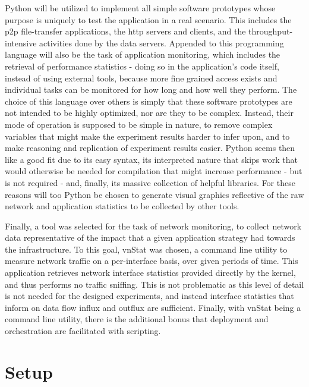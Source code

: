     Python \cite{python} will be utilized to implement all simple software prototypes whose purpose is uniquely to test the application in a real scenario.
    This includes the \gls{p2p} file-transfer applications, the \gls{http} servers and clients, and the throughput-intensive activities done by the data servers.
    Appended to this programming language will also be the task of application monitoring, which includes the retrieval of performance statistics - doing so in the application's code itself, instead of using external tools, because more fine grained access exists and individual tasks can be monitored for how long and how well they perform.
    The choice of this language over others is simply that these software prototypes are not intended to be highly optimized, nor are they to be complex.
    Instead, their mode of operation is supposed to be simple in nature, to remove complex variables that might make the experiment results harder to infer upon, and to make reasoning and replication of experiment results easier.
    Python seems then like a good fit due to its easy syntax, its interpreted nature that skips work that would otherwise be needed for compilation that might increase performance - but is not required - and, finally, its massive collection of helpful libraries.
    For these reasons will too Python be chosen to generate visual graphics reflective of the raw network and application statistics to be collected by other tools.

    Finally, a tool was selected for the task of network monitoring, to collect network data representative of the impact that a given application strategy had towards the infrastructure.
    To this goal, vnStat \cite{vnstat} was chosen, a command line utility to measure network traffic on a per-interface basis, over given periods of time.
    This application retrieves network interface statistics provided directly by the kernel, and thus performs no traffic sniffing.
    This is not problematic as this level of detail is not needed for the designed experiments, and instead interface statistics that inform on data flow influx and outflux are sufficient.
    Finally, with vnStat being a command line utility, there is the additional bonus that deployment and orchestration are facilitated with scripting.

\section{Setup}

\label{sec:experiments-setup}


